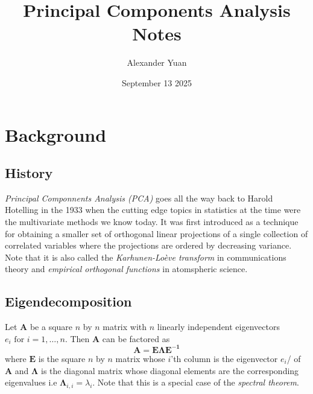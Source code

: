 \documentclass{article}
\title{Principal Components Analysis Notes}
\author{Alexander Yuan}
\date{September 13 2025}
\begin{document}
 
\maketitle

\section{Background}
\subsection{History}
\emph{Principal Componnents Analysis (PCA)} goes all the way back to Harold Hotelling in the 1933 when the cutting edge topics in statistics at the time were the multivariate methods we know today. It was first 
introduced as a technique for obtaining a smaller set of orthogonal linear projections of a single collection of correlated variables where the projections are ordered by decreasing variance. Note that it is also
called the \emph{Karhunen-Loève transform} in communications theory and \emph{empirical orthogonal functions} in atomspheric science.

\subsection{Eigendecomposition}
Let $\mathbf{A}$ be a square $n$ by $n$ matrix with $n$ linearly independent eigenvectors $e_i \text{ for } i = 1, \ldots , n$. Then $\mathbf{A}$ can be factored as 
$$
\mathbf{A = E \Lambda E^{-1}}
$$
where $\mathbf{E}$ is the square $n$ by $n$ matrix whose $i$'th column is the eigenvector $e_i$/ of $\mathbf{A}$ and $\mathbf{\Lambda}$ is the diagonal matrix whose diagonal elements are the corresponding eigenvalues 
i.e $\mathbf{\Lambda}_{i,i}= \lambda_i$. Note that this is a special case of the \emph{spectral theorem}.
\end{document}
